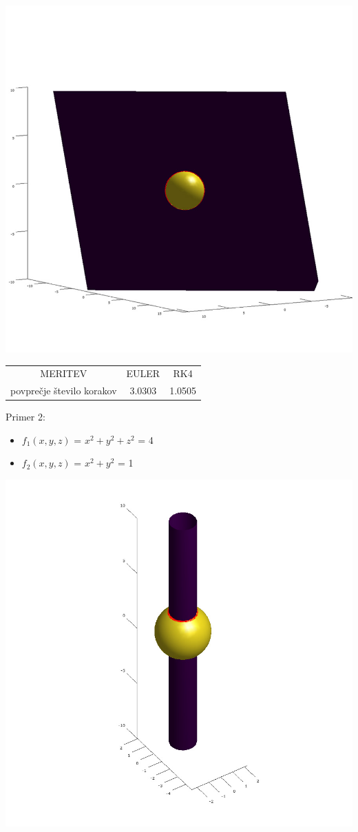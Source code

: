 \documentclass[]{article}
\begin{document}
	\includegraphics[scale=0.3]{primer1_2}
	\begin{center}
	\begin{tabular}{ |c|c|c| } 
 		\hline
 			MERITEV & EULER & RK4 \\ 
			povpre\v{c}je \v{s}tevilo korakov & 3.0303 & 1.0505 \\ 
 		\hline
 	\end{tabular}
	\end{center}
	Primer 2:
	\begin{itemize}  
		\item $f_{1}(x,y,z)$ = $x^2 + y^2 + z^2$ = 4
		\item $f_{2}(x,y,z)$ = $x^2 + y^2$ = 1
	\end{itemize}
	\includegraphics[scale=0.3]{primer2_1}
\end{document}
